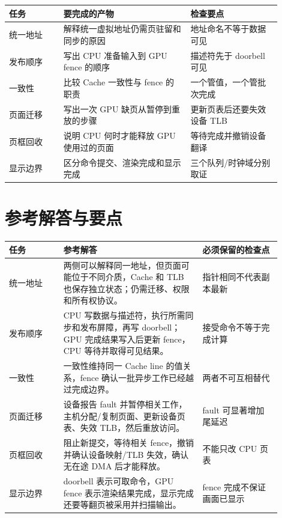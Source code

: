 \begin{longtable}{L{0.18\linewidth}L{0.42\linewidth}L{0.30\linewidth}}
\toprule
任务 & 要完成的产物 & 检查要点 \\
\midrule
统一地址 & 解释统一虚拟地址仍需页驻留和同步的原因 & 地址命名不等于数据可见 \\
发布顺序 & 写出 CPU 准备输入到 GPU fence 的顺序 & 描述符先于 doorbell 可见 \\
一致性 & 比较 Cache 一致性与 fence 的职责 & 一个管值，一个管批次完成 \\
页面迁移 & 写出一次 GPU 缺页从暂停到重放的步骤 & 更新页表后还要失效设备 TLB \\
页框回收 & 说明 CPU 何时才能释放 GPU 使用过的页面 & 等待完成并撤销设备翻译 \\
显示边界 & 区分命令提交、渲染完成和显示完成 & 三个队列/时钟域分别取证 \\
\bottomrule
\end{longtable}

\section*{参考解答与要点}

\begin{longtable}{L{0.18\linewidth}L{0.46\linewidth}L{0.26\linewidth}}
\toprule
任务 & 参考解答 & 必须保留的检查点 \\
\midrule
统一地址 & 两侧可以解释同一地址，但页面可能位于不同介质，Cache 和 TLB 也保存独立状态；仍需迁移、权限和所有权协议。 & 指针相同不代表副本最新 \\
发布顺序 & CPU 写数据与描述符，执行所需同步和发布屏障，再写 doorbell；GPU 完成结果写入后更新 fence，CPU 等待并取得可见结果。 & 接受命令不等于完成计算 \\
一致性 & 一致性维持同一 Cache line 的值关系，fence 确认一批异步工作已经越过完成边界。 & 两者不可互相替代 \\
页面迁移 & 设备报告 fault 并暂停相关工作，主机分配/复制页面、更新设备页表、失效 TLB，然后重放访问。 & fault 可显著增加尾延迟 \\
页框回收 & 阻止新提交，等待相关 fence，撤销并确认设备映射/TLB 失效，确认无在途 DMA 后才能释放。 & 不能只改 CPU 页表 \\
显示边界 & doorbell 表示可取命令，GPU fence 表示渲染结果完成，显示完成还要等翻页被采用并扫描输出。 & fence 完成不保证画面已显示 \\
\bottomrule
\end{longtable}
